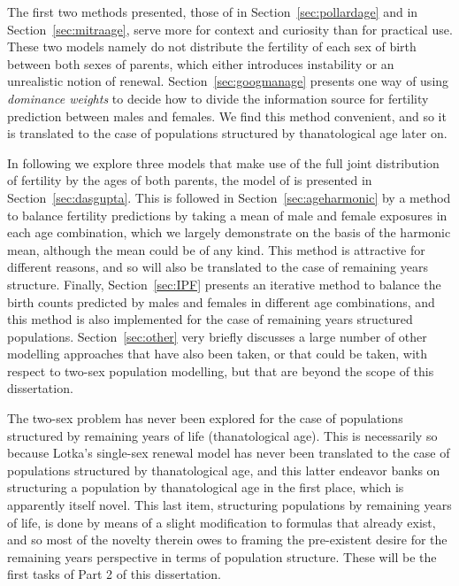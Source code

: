 The first two methods presented, those of \citet{pollard1948measurement} in
Section~\ref{sec:pollardage} and
\citet{mitra1978derivation} in Section~\ref{sec:mitraage}, serve more for context and curiosity than for
practical use. These two models namely do not distribute the fertility of each
sex of birth between both sexes of parents, which either introduces instability
or an unrealistic notion of renewal. Section~\ref{sec:googmanage} presents one
way of using \textit{dominance weights} to decide how to divide the information source 
for fertility prediction between males and females. We find this method
convenient, and so it is translated to the case of populations structured by
thanatological age later on. 

In following we explore three models that make use of the full joint
distribution of fertility by the ages of both parents, the model of
\citet{gupta1978alternative} is presented in Section~\ref{sec:dasgupta}. This is
followed in Section~\ref{sec:ageharmonic} by a method to balance fertility
predictions by taking a mean of male and female exposures in each age combination, 
which we largely demonstrate on the
basis of the harmonic mean, although the mean could be of any kind. This method
is attractive for different reasons, and so will also be translated to the case
of remaining years structure. Finally, Section~\ref{sec:IPF} presents an
iterative method to balance the birth counts predicted by males and females in
different age combinations, and this method is also implemented for the case of
remaining years structured populations. Section~\ref{sec:other} very briefly
discusses a large number of other modelling approaches that have also been
taken, or that could be taken, with respect to two-sex population modelling, but
that are beyond the scope of this dissertation.

The two-sex problem has never been explored for the case of populations
structured by remaining years of life (thanatological age). This is necessarily 
so because Lotka's single-sex renewal model \citep{sharpe1911problem} has never
been translated to the case of populations structured by thanatological age, 
and this latter endeavor banks on structuring a population by 
thanatological age in the first place, which is apparently itself novel. This
last item, structuring populations by remaining years of life, is done by means
of a slight modification to formulas that already exist, and so most of the
novelty therein owes to framing the pre-existent desire for the remaining years perspective in
terms of population structure. These will be the first tasks of Part 2
of this dissertation.

